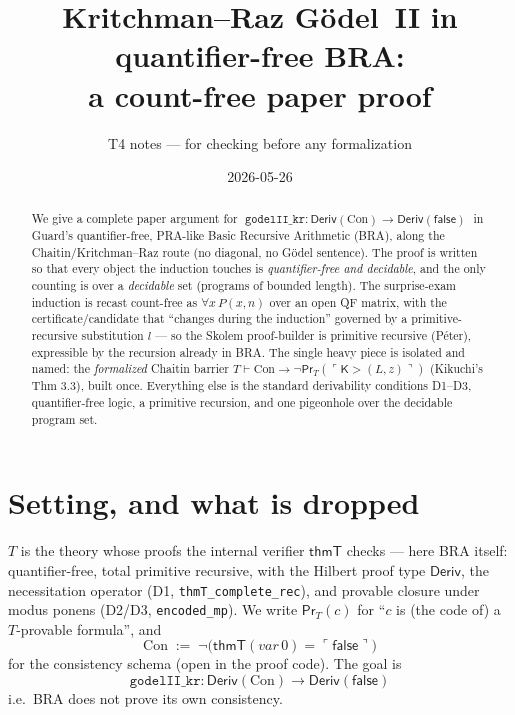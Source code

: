 \documentclass[11pt]{article}
\title{Kritchman--Raz G\"odel~II in quantifier-free BRA:\\
       a count-free paper proof}
\author{T4 notes --- for checking before any formalization}
\date{2026-05-26}
\theoremstyle{plain}
\theoremstyle{definition}
\theoremstyle{remark}
\newcommand{\code}[1]{\ulcorner #1 \urcorner}
\newcommand{\Prov}{\mathsf{Pr}}
\newcommand{\Con}{\mathrm{Con}}
\newcommand{\Kgt}{\mathsf{K{>}}}
\newcommand{\false}{\mathsf{false}}
\newcommand{\thmT}{\mathsf{thmT}}
\begin{document}
\maketitle

\begin{abstract}
We give a complete paper argument for
$\;\texttt{godelII\_kr} : \mathsf{Deriv}(\Con) \to \mathsf{Deriv}(\false)\;$
in Guard's quantifier-free, PRA-like Basic Recursive Arithmetic (BRA), along the
Chaitin/Kritchman--Raz route (no diagonal, no G\"odel sentence). The proof is
written so that every object the induction touches is \emph{quantifier-free and
decidable}, and the only counting is over a \emph{decidable} set (programs of
bounded length). The surprise-exam induction is recast count-free as
$\forall x\,P(x,n)$ over an open QF matrix, with the certificate/candidate that
``changes during the induction'' governed by a primitive-recursive substitution
$l$ --- so the Skolem proof-builder is primitive recursive (P\'eter), expressible
by the recursion already in BRA. The single heavy piece is isolated and named: the
\emph{formalized} Chaitin barrier $T \vdash \Con \to \neg\Prov_T(\code{\Kgt(L,z)})$
(Kikuchi's Thm 3.3), built once. Everything else is the standard derivability
conditions D1--D3, quantifier-free logic, a primitive recursion, and one
pigeonhole over the decidable program set.
\end{abstract}

\section{Setting, and what is dropped}

$T$ is the theory whose proofs the internal verifier $\thmT$ checks --- here BRA
itself: quantifier-free, total primitive recursive, with the Hilbert proof type
$\mathsf{Deriv}$, the necessitation operator (D1, \texttt{thmT\_complete\_rec}), and
provable closure under modus ponens (D2/D3, \texttt{encoded\_mp}). We write
$\Prov_T(c)$ for ``$c$ is (the code of) a $T$-provable formula'', and
\[
  \Con \;:=\; \neg\big(\thmT(\mathit{var}\,0) = \code{\false}\big)
\]
for the consistency schema (open in the proof code). The goal is
\[
  \boxed{\ \texttt{godelII\_kr} : \mathsf{Deriv}(\Con) \longrightarrow
  \mathsf{Deriv}(\false)\ }
\]
i.e.\ BRA does not prove its own consistency.
\end{document}

